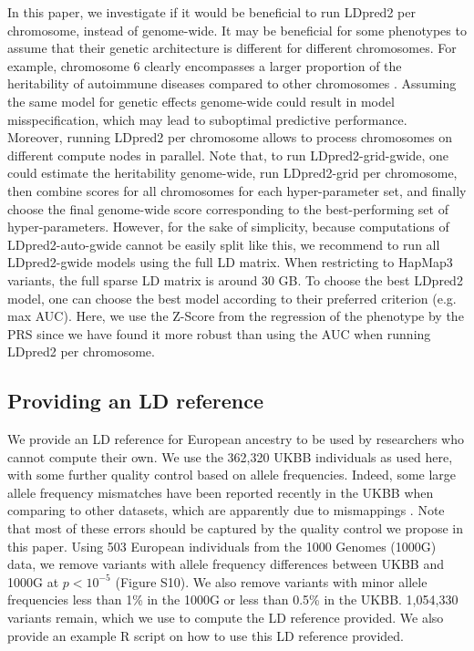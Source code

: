 \documentclass{bioinfo}
\begin{document}
\begin{methods}
In this paper, we investigate if it would be beneficial to run LDpred2 per chromosome, instead of genome-wide.
It may be beneficial for some phenotypes to assume that their genetic architecture is different for different chromosomes.
For example, chromosome 6 clearly encompasses a larger proportion of the heritability of autoimmune diseases compared to other chromosomes \cite[]{shi2016contrasting}.
Assuming the same model for genetic effects genome-wide could result in model misspecification, which may lead to suboptimal predictive performance.
Moreover, running LDpred2 per chromosome allows to process chromosomes on different compute nodes in parallel.
Note that, to run LDpred2-grid-gwide, one could estimate the heritability genome-wide, run LDpred2-grid per chromosome, then combine scores for all chromosomes for each hyper-parameter set, and finally choose the final genome-wide score corresponding to the best-performing set of hyper-parameters.
However, for the sake of simplicity, because computations of LDpred2-auto-gwide cannot be easily split like this, we recommend to run all LDpred2-gwide models using the full LD matrix. When restricting to HapMap3 variants, the full sparse LD matrix is around 30 GB.
To choose the best LDpred2 model, one can choose the best model according to their preferred criterion (e.g. max AUC). 
Here, we use the Z-Score from the regression of the phenotype by the PRS since we have found it more robust than using the AUC when running LDpred2 per chromosome.

\subsection*{Providing an LD reference}\label{sec:ld-ref}

We provide an LD reference for European ancestry to be used by researchers who cannot compute their own.
We use the 362,320 UKBB individuals as used here, with some further quality control based on allele frequencies.
Indeed, some large allele frequency mismatches have been reported recently in the UKBB when comparing to other datasets, which are apparently due to mismappings \cite[]{kunert2020allele}.
Note that most of these errors should be captured by the quality control we propose in this paper.
Using 503 European individuals from the 1000 Genomes (1000G) data, we remove variants with allele frequency differences between UKBB and 1000G at $p<10^{-5}$ (Figure S10).
We also remove variants with minor allele frequencies less than 1\% in the 1000G or less than 0.5\% in the UKBB.
1,054,330 variants remain, which we use to compute the LD reference provided.
We also provide an example R script on how to use this LD reference provided.
	
\end{methods}
\end{document}
